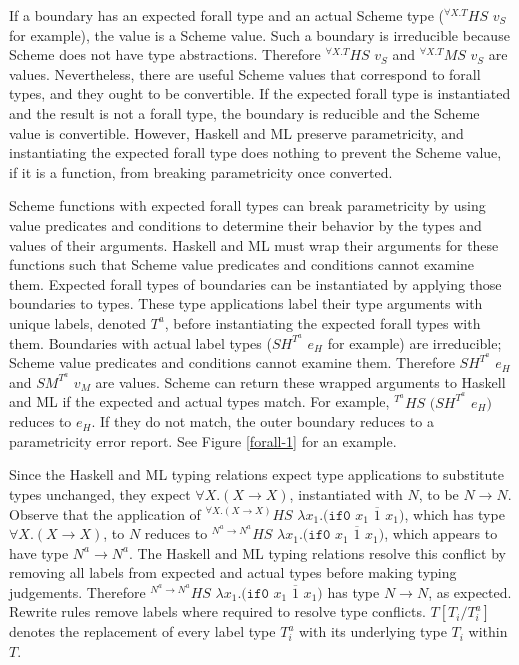 If a boundary has an expected forall type and an actual Scheme type ($^{\forall X.T}HS$ $v_{S}$ for example), the value is a Scheme value.  Such a boundary is irreducible because Scheme does not have type abstractions.  Therefore $^{\forall X.T}HS$ $v_{S}$ and $^{\forall X.T}MS$ $v_{S}$ are values.  Nevertheless, there are useful Scheme values that correspond to forall types, and they ought to be convertible.  If the expected forall type is instantiated and the result is not a forall type, the boundary is reducible and the Scheme value is convertible.  However, Haskell and ML preserve parametricity, and instantiating the expected forall type does nothing to prevent the Scheme value, if it is a function, from breaking parametricity once converted.

Scheme functions with expected forall types can break parametricity by using value predicates and conditions to determine their behavior by the types and values of their arguments.  Haskell and ML must wrap their arguments for these functions such that Scheme value predicates and conditions cannot examine them.  Expected forall types of boundaries can be instantiated by applying those boundaries to types.  These type applications label their type arguments with unique labels, denoted $T^{a}$, before instantiating the expected forall types with them.  Boundaries with actual label types ($SH^{T^{a}}$ $e_{H}$ for example) are irreducible; Scheme value predicates and conditions cannot examine them.  Therefore $SH^{T^{a}}$ $e_{H}$ and $SM^{T^{a}}$ $v_{M}$ are values.  Scheme can return these wrapped arguments to Haskell and ML if the expected and actual types match.  For example, $^{T^{a}}HS$ $(SH^{T^{a}}$ $e_{H})$ reduces to $e_{H}$.  If they do not match, the outer boundary reduces to a parametricity error report.  See Figure \ref{forall-1} for an example.



Since the Haskell and ML typing relations expect type applications to substitute types unchanged, they expect $\forall X.(X\rightarrow X)$, instantiated with $N$, to be $N\rightarrow N$.  Observe that the application of $^{\forall X.(X\rightarrow X)}HS$ $\lambda x_{1}.(\mathtt{if0}$ $x_{1}$ $\overline{1}$ $x_{1})$, which has type $\forall X.(X\rightarrow X)$, to $N$ reduces to $^{N^{a}\rightarrow N^{a}}HS$ $\lambda x_{1}.(\mathtt{if0}$ $x_{1}$ $\overline{1}$ $x_{1})$, which appears to have type $N^{a}\rightarrow N^{a}$.  The Haskell and ML typing relations resolve this conflict by removing all labels from expected and actual types before making typing judgements.  Therefore $^{N^{a}\rightarrow N^{a}}HS$ $\lambda x_{1}.(\mathtt{if0}$ $x_{1}$ $\overline{1}$ $x_{1})$ has type $N\rightarrow N$, as expected.  Rewrite rules remove labels where required to resolve type conflicts.  $T[T_{i}/T_{i}^{a}]$ denotes the replacement of every label type $T_{i}^{a}$ with its underlying type $T_{i}$ within $T$.

